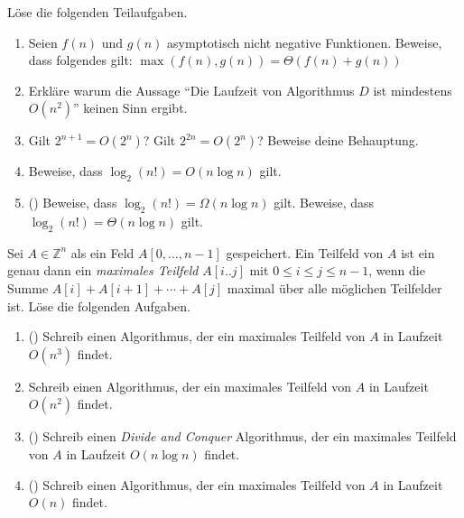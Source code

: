 \documentclass{uebung_cs}
\begin{document}
\begin{aufgabe}
	Löse die folgenden Teilaufgaben.
	\begin{enumerate}
		\item Seien $f(n)$ und $g(n)$ asymptotisch nicht negative Funktionen.
		Beweise, dass folgendes gilt: $\max(f(n),g(n)) = \Theta(f(n) + g(n))$
		\item Erkläre warum die Aussage \enquote{Die Laufzeit von Algorithmus $D$ ist mindestens $O(n^2)$} keinen Sinn ergibt.
		\item Gilt $2^{n+1} = O(2^n)$? Gilt $2^{2n} = O(2^n)$? Beweise deine Behauptung.
		\item Beweise, dass $\log_2(n!) = O(n \log n)$ gilt.
		\item (\hard) Beweise, dass $\log_2(n!) = \Omega(n\log n)$ gilt.
		Beweise, dass $\log_2(n!) = \Theta(n\log n)$ gilt.
	\end{enumerate}
\end{aufgabe}

\begin{aufgabe}
	Sei $A\in \mathbb{Z}^n$ als ein Feld $A[0, \dots, n-1]$ gespeichert.
	Ein Teilfeld von $A$ ist ein genau dann ein \textit{maximales Teilfeld} $A[i..j]$ mit $0\leq i\leq j\leq n-1$, wenn die Summe $A[i] + A[i+1] + \cdots + A[j]$ maximal über alle möglichen Teilfelder ist.
	Löse die folgenden Aufgaben.
	\begin{enumerate}
		\item (\warmup) Schreib einen Algorithmus, der ein maximales Teilfeld von $A$ in Laufzeit $O(n^3)$ findet.
		\item Schreib einen Algorithmus, der ein maximales Teilfeld von $A$ in Laufzeit $O(n^2)$ findet.
		\item (\hard) Schreib einen \textit{Divide and Conquer} Algorithmus, der ein maximales Teilfeld von $A$ in Laufzeit $O(n\log n)$ findet.
		\item (\veryhard) Schreib einen Algorithmus, der ein maximales Teilfeld von $A$ in Laufzeit $O(n)$ findet.
	\end{enumerate}
\end{aufgabe}
\end{document}
